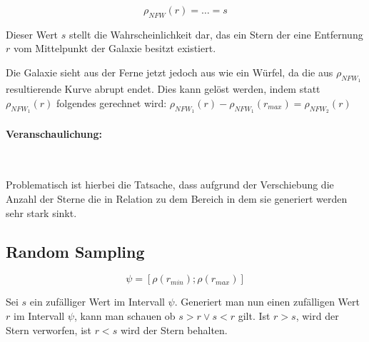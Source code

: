 \begin{equation}
\rho_{NFW}(r) = \dots = s
\end{equation}

Dieser Wert \( s \) stellt die Wahrscheinlichkeit dar, das ein Stern der
eine Entfernung \( r \) vom Mittelpunkt der Galaxie besitzt existiert.

Die Galaxie sieht aus der Ferne jetzt jedoch aus wie ein Würfel, da die aus \(
\rho_{NFW_{1}} \) resultierende Kurve abrupt endet. Dies kann gelöst werden,
indem statt \( \rho_{NFW_{1}}(r) \) folgendes gerechnet wird: \(
\rho_{NFW_{1}}(r) - \rho_{NFW_{1}}(r_{max}) = \rho_{NFW_{2}}(r)\)

\paragraph{Veranschaulichung:}~\\

\begin{center}
\end{center}

Problematisch ist hierbei die Tatsache, dass aufgrund der Verschiebung die
Anzahl der Sterne die in Relation zu dem Bereich in dem sie generiert werden
sehr stark sinkt.

\subsection{Random Sampling} \label{subsec:random_sampling}
\begin{equation}\label{range:psi}
    \psi = [ \rho(r_{min}); \rho(r_{max}) ] 
\end{equation}

Sei \( s \) ein zufälliger Wert im Intervall \( \psi \).  Generiert man nun
einen zufälligen Wert \( r \) im Intervall \( \psi \), kann man schauen ob \( s
> r \lor s < r \) gilt. Ist \( r
> s \), wird der Stern verworfen, ist \( r < s \) wird der Stern behalten.

